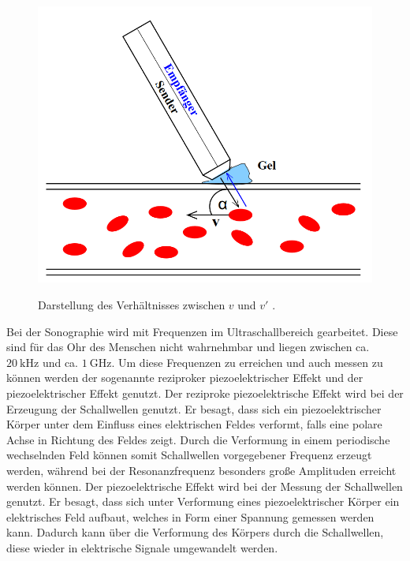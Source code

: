 \begin{figure}
	\centering
	\caption{Darstellung des Verhältnisses zwischen $v$ und $v'$ \cite{US3}.}
	\includegraphics[width=\linewidth-70pt,height=0.3\textheight,keepaspectratio]{content/images/GesSkizze.png}
	\label{fig:GesSkizze}
\end{figure}

Bei der Sonographie wird mit Frequenzen im Ultraschallbereich gearbeitet. Diese sind für das Ohr des Menschen nicht wahrnehmbar und liegen zwischen ca. $\SI{20}{\kilo\hertz}$ und ca. $\SI{1}{\giga\hertz}$. Um diese Frequenzen zu erreichen und auch messen zu können werden der sogenannte reziproker piezoelektrischer Effekt und der piezoelektrischer Effekt genutzt.
Der reziproke piezoelektrische Effekt wird bei der Erzeugung der Schallwellen genutzt. Er besagt, dass sich ein piezoelektrischer Körper unter dem Einfluss eines elektrischen Feldes verformt, falls eine polare Achse in Richtung des Feldes zeigt. Durch die Verformung in einem periodische wechselnden Feld können somit Schallwellen vorgegebener Frequenz erzeugt werden, während bei der Resonanzfrequenz besonders große Amplituden erreicht werden können. Der piezoelektrische Effekt wird bei der Messung der Schallwellen genutzt. Er besagt, dass sich unter Verformung eines piezoelektrischer Körper ein elektrisches Feld aufbaut, welches in Form einer Spannung gemessen werden kann. Dadurch kann über die Verformung des Körpers durch die Schallwellen, diese wieder in elektrische Signale umgewandelt werden.
